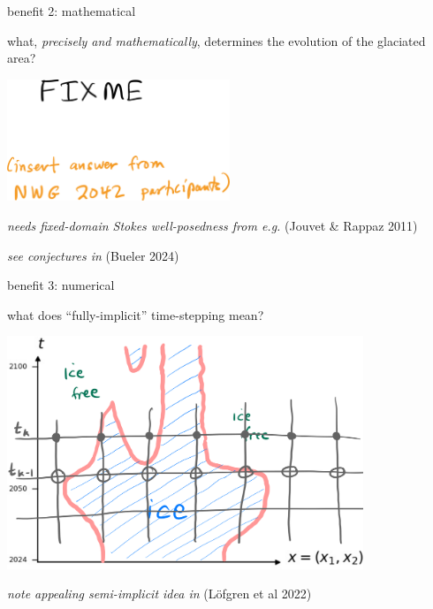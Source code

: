 \documentclass[10pt,dvipsnames]{beamer}
\begin{document}
\begin{frame}{benefit 2: mathematical}

what, \emph{precisely and mathematically}, determines the evolution of the glaciated area?

\bigskip

\begin{center}
\includegraphics[width=0.5\textwidth]{fixme2042}
\end{center}

\bigskip
{}

{\color{blue} {\footnotesize \emph{needs fixed-domain Stokes well-posedness from e.g.} (Jouvet \& Rappaz 2011)}}

{\color{blue} {\footnotesize \emph{see conjectures in} (Bueler 2024)}}
\end{frame}


\begin{frame}{benefit 3: numerical}

what does ``fully-implicit'' time-stepping mean?

\medskip

\begin{center}
\includegraphics[width=0.8\textwidth]{implicitstep}
\end{center}

\medskip
{}

{\color{blue} {\footnotesize \emph{note appealing semi-implicit idea in} (L\"ofgren et al 2022)}}
\end{frame}
\end{document}
